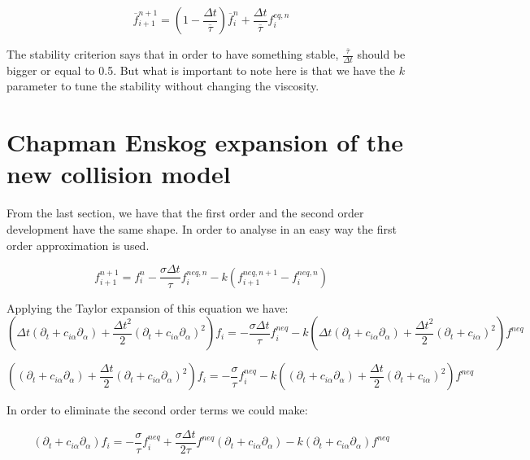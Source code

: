 \documentclass{article}
\begin{document}
\begin{equation*}
    \overline{f}_{i+1}^{n+1} =(1-\frac{\Delta t}{\overline{\tau }})\overline{f}_{i}^{n} + \frac{\Delta t}{\overline{\tau }}f_{i}^{eq,n}
\end{equation*}

The stability criterion says that in order to have something stable, $\frac{\overline{\tau}}{\Delta t}$ should be bigger or equal to 0.5.
But what is important to note here is that we have the $k$ parameter to tune the stability without changing the viscosity.

\section{Chapman Enskog expansion of the new collision model}
From the last section, we have that the first order and the second order development have the same shape. In order to analyse in an easy way the first order approximation is
used.

\begin{equation}
    f_{i+1}^{n+1} =f_{i}^{n} -\frac{\sigma\Delta t}{\tau } f_{i}^{neq,n} -k\left( f_{i+1}^{neq,n+1} -f_{i}^{neq,n}\right)
\end{equation}

Applying the Taylor expansion of this equation we have:
\begin{equation}
    \left( \Delta t( \partial _{t} +c_{i\alpha } \partial _{\alpha }) +\frac{\Delta t^{2}}{2}( \partial _{t} +c_{i\alpha } \partial _{\alpha })^{2}\right) f_{i} = -\frac{\sigma\Delta t}{\tau } f_{i}^{neq} -k\left( \Delta t( \partial _{t} +c_{i\alpha } \partial _{\alpha }) +\frac{\Delta t^{2}}{2}( \partial _{t} +c_{i\alpha })^{2}\right) f^{neq}
\end{equation}

\begin{equation*}
    \left(( \partial _{t} +c_{i\alpha } \partial _{\alpha }) +\frac{\Delta t}{2}( \partial _{t} +c_{i\alpha } \partial _{\alpha })^{2}\right) f_{i} = -\frac{\sigma}{\tau } f_{i}^{neq} -k\left(( \partial _{t} +c_{i\alpha } \partial _{\alpha }) +\frac{\Delta t}{2}( \partial _{t} +c_{i\alpha })^{2}\right) f^{neq}
\end{equation*}

In order to eliminate the second order terms we could make:

\begin{equation}
    ( \partial _{t} +c_{i\alpha } \partial _{\alpha }) f_{i} = -\frac{\sigma}{\tau } f_{i}^{neq} +\frac{\sigma\Delta t}{2\tau } f^{neq}( \partial _{t} +c_{i\alpha } \partial _{\alpha }) -k( \partial _{t} +c_{i\alpha } \partial _{\alpha }) f^{neq}
\end{equation}
\end{document}
